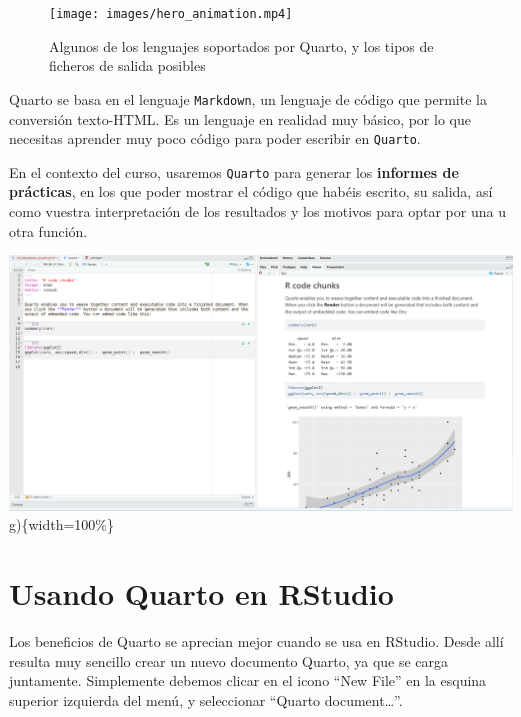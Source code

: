 \documentclass[
  letterpaper,
  DIV=11,
  numbers=noendperiod]{scrreprt}
\begin{document}
\begin{figure}

{\centering \texttt{[image: images/hero\_animation.mp4]}

}

\caption{Algunos de los lenguajes soportados por Quarto, y los tipos de
ficheros de salida posibles}

\end{figure}

Quarto se basa en el lenguaje \texttt{Markdown}, un lenguaje de código
que permite la conversión texto-HTML. Es un lenguaje en realidad muy
básico, por lo que necesitas aprender muy poco código para poder
escribir en \texttt{Quarto}.

En el contexto del curso, usaremos \texttt{Quarto} para generar los
\textbf{informes de prácticas}, en los que poder mostrar el código que
habéis escrito, su salida, así como vuestra interpretación de los
resultados y los motivos para optar por una u otra función.

\includegraphics{images/02-intro-rmarkdown/chunk_quarto.png}
g)\{width=100\%\}

\hypertarget{usando-quarto-en-rstudio}{%
\section{Usando Quarto en RStudio}\label{usando-quarto-en-rstudio}}

Los beneficios de Quarto se aprecian mejor cuando se usa en RStudio.
Desde allí resulta muy sencillo crear un nuevo documento Quarto, ya que
se carga juntamente. Simplemente debemos clicar en el icono ``New File''
en la esquina superior izquierda del menú, y seleccionar ``Quarto
document\ldots{}''.
\end{document}
